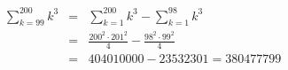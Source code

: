 \documentclass[11pt]{exam}
\begin{document}
\begin{questions}
\begin{solution}
\begin{eqnarray*}
    \sum_{k=99}^{200} k^3 &=& \sum_{k=1}^{200} k^3 - \sum_{k=1}^{98} k^3 \\
      &=& \frac{200^2 \cdot 201^2}{4} - \frac{98^2 \cdot 99^2}{4} \\
      &=& 404010000 - 23532301 = 380477799
\end{eqnarray*}
\end{solution}



\end{questions}
\end{document}

